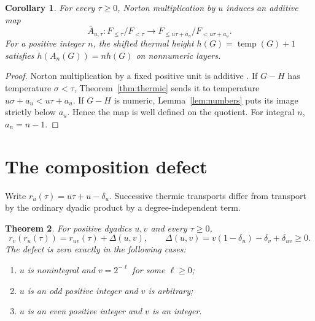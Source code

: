 \documentclass[11pt]{article}
\newtheorem{theorem}{Theorem}[section]
\newtheorem{corollary}[theorem]{Corollary}
\theoremstyle{definition}
\theoremstyle{remark}
\newcommand{\temp}{\operatorname{temp}}
\begin{document}
\begin{corollary}\label{cor:residue}
For every $\tau\ge0$, Norton multiplication by $u$ induces an additive map
\[
 \overline A_{u,\tau}:
 F_{\le\tau}/F_{<\tau}
 \longrightarrow
 F_{\le u\tau+a_u}/F_{<u\tau+a_u}.
\]
For a positive integer $n$, the shifted thermal height
$h(G)=\temp(G)+1$ satisfies $h(A_n(G))=nh(G)$ on nonnumeric layers.
\end{corollary}

\begin{proof}
Norton multiplication by a fixed positive unit is additive
\cite{berlekampconwayguy1982,mesdal2009}.  If $G-H$ has temperature
$\sigma<\tau$, Theorem~\ref{thm:thermic} sends it to temperature
$u\sigma+a_u<u\tau+a_u$.  If $G-H$ is numeric,
Lemma~\ref{lem:numbers} puts its image strictly below $a_u$.  Hence the map is
well defined on the quotient.  For integral $n$, $a_n=n-1$.
\end{proof}

\section{The composition defect}

Write $r_u(\tau)=u\tau+u-\delta_u$.  Successive thermic transports differ
from transport by the ordinary dyadic product by a degree-independent term.

\begin{theorem}\label{thm:defect}
For positive dyadics $u,v$ and every $\tau\ge0$,
\begin{equation}
 r_v(r_u(\tau))=r_{uv}(\tau)+\Delta(u,v),
 \qquad
 \Delta(u,v)=v(1-\delta_u)-\delta_v+\delta_{uv}\ge0.
\end{equation}
The defect is zero exactly in the following cases:
\begin{enumerate}
\item $u$ is nonintegral and $v=2^{-\ell}$ for some $\ell\ge0$;
\item $u$ is an odd positive integer and $v$ is arbitrary;
\item $u$ is an even positive integer and $v$ is an integer.
\end{enumerate}
\end{theorem}
\end{document}
